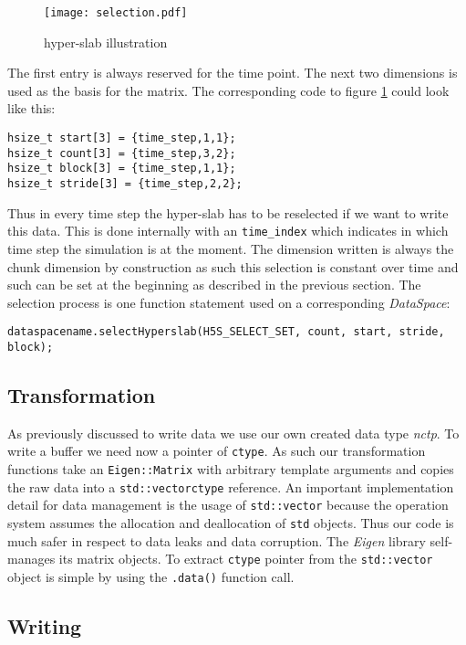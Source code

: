 \documentclass{article}
\begin{document}
\begin{figure}[ht!]
\centering
\texttt{[image: selection.pdf]}
\caption{hyper-slab illustration}
\label{fig:hyperslab}
\end{figure}
The first entry is always reserved for the time point. The next two dimensions is used as the basis for the matrix. The corresponding code to figure \ref{fig:hyperslab} could look like this:
\begin{lstlisting}
hsize_t start[3] = {time_step,1,1};
hsize_t count[3] = {time_step,3,2};
hsize_t block[3] = {time_step,1,1};
hsize_t stride[3] = {time_step,2,2};
\end{lstlisting}
Thus in every time step the hyper-slab has to be reselected if we want to write this data. This is done internally with an \texttt{time\_index} which indicates in which time step the simulation is at the moment. The dimension written is always the chunk dimension by construction as such this selection is constant over time and such can be set at the beginning as described in the previous section.
The selection process is one function statement used on a corresponding \textit{DataSpace}:
\begin{lstlisting}
dataspacename.selectHyperslab(H5S_SELECT_SET, count, start, stride, block);
\end{lstlisting}

\subsection{Transformation}
As previously discussed to write data we use our own created data type \textit{nctp}. To write a buffer we need now a pointer of \texttt{ctype}. As such our transformation functions take an \texttt{Eigen::Matrix} with arbitrary template arguments and copies the raw data into a \texttt{std::vector\<ctype\>} reference. An important implementation detail for data management is the usage of \texttt{std::vector} because the operation system assumes the allocation and deallocation of \texttt{std} objects. Thus our code is much safer in respect to data leaks and data corruption. The \textit{Eigen} library self-manages its matrix objects. To extract \texttt{ctype} pointer from the \texttt{std::vector} object is simple by using the \texttt{.data()} function call. 

\subsection{Writing}
\end{document}
